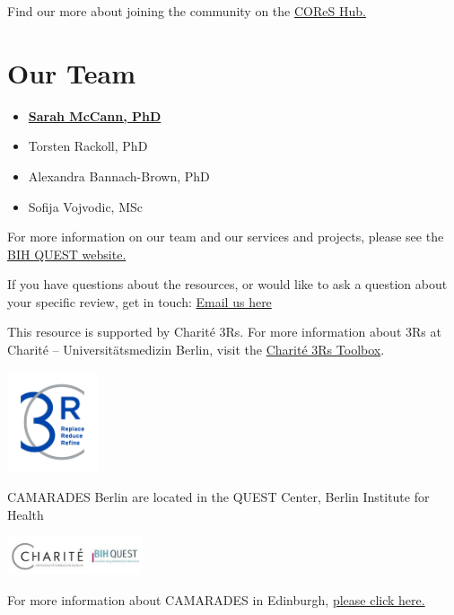 \documentclass[
]{book}
\providecommand{\tightlist}{%
  \setlength{\itemsep}{0pt}\setlength{\parskip}{0pt}}
\begin{document}
Find our more about joining the community on the \href{https://cores-hub.io/cores-join-the-community/}{COReS Hub.}

\section{Our Team}\label{our-team-1}

\begin{itemize}
\tightlist
\item
  \textbf{\href{https://www.bihealth.org/en/quest/teams/team/research-group-mccann}{Sarah McCann, PhD}}
\item
  Torsten Rackoll, PhD
\item
  Alexandra Bannach-Brown, PhD
\item
  Sofija Vojvodic, MSc
\end{itemize}

For more information on our team and our services and projects, please see the \href{https://www.bihealth.org/en/quest/service/service/camarades-facility-for-the-systematic-review-and-meta-analysis-1}{BIH QUEST website.}

If you have questions about the resources, or would like to ask a question about your specific review, get in touch: \href{mailto:CAMARADES.berlin@charite.de}{Email us here}

This resource is supported by Charité 3Rs. For more information about 3Rs at Charité -- Universitätsmedizin Berlin, visit the \href{https://charite3r.charite.de/en/charite_3r_toolbox/}{Charité 3Rs Toolbox}.

\includegraphics[width=0.2\textwidth,height=\textheight]{figs/C3R_Screen_Farbe.jpg}

CAMARADES Berlin are located in the QUEST Center, Berlin Institute for Health

\includegraphics[width=0.3\textwidth,height=\textheight]{charite-BIHquest.jpg}

For more information about CAMARADES in Edinburgh, \href{https://www.ed.ac.uk/clinical-brain-sciences/research/camarades}{please click here.}

  
\end{document}
